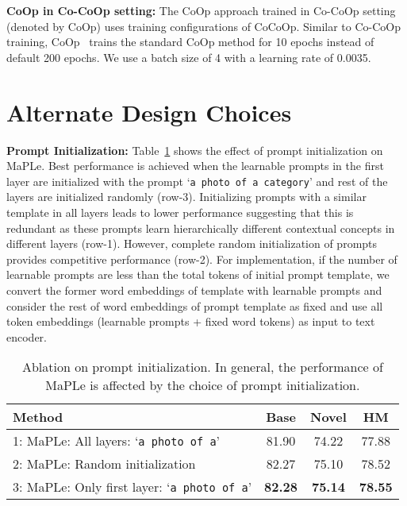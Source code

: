 \documentclass[10pt,twocolumn,letterpaper]{article}
\newcommand{\tablestyle}[2]{\setlength{\tabcolsep}{#1}\renewcommand{\arraystretch}{#2}\centering\footnotesize}
\newcommand{\txt}[1]{{\texttt{#1}}}
\begin{document}
\noindent \textbf{CoOp in Co-CoOp setting:} The CoOp approach trained in Co-CoOp setting (denoted by CoOp\dag) uses training configurations of CoCoOp. Similar to Co-CoOp training, CoOp\dag~ trains the standard CoOp method for 10 epochs instead of default 200 epochs. We use a batch size of 4 with a learning rate of 0.0035.

\section{Alternate Design Choices}
\label{appendix:alternate_design_choices}

\noindent \textbf{Prompt Initialization:} 
 Table~\ref{table:prompt_initialization} shows the effect of prompt initialization on MaPLe. Best performance is achieved when the learnable prompts in the first layer are initialized with the prompt `\txt{a photo of a category}' and rest of the layers are initialized randomly (row-3). Initializing prompts with a similar template in all layers leads to lower performance suggesting that 
this is redundant as these prompts learn hierarchically different contextual concepts in different layers (row-1). However, complete random initialization of prompts provides competitive performance (row-2). For implementation, if the number of learnable prompts  are less than the total tokens of initial prompt template, we convert the former  word embeddings of template with learnable prompts and consider the rest of word embeddings of prompt template as fixed and use all token embeddings (learnable prompts + fixed word tokens) as input to text encoder.

\begin{table}[h!]
\centering
    \tablestyle{6pt}{1.1}
\addtolength{\tabcolsep}{-4.5pt}
\begin{tabular}{l ccc}
\toprule
Method  & Base & Novel & HM\\
\midrule
1: MaPLe: All layers: `\txt{a photo of a}' & 81.90 & 74.22 &	77.88\\
2: MaPLe: Random initialization  & 82.27 &	75.10 &	78.52\\
3: MaPLe: Only first layer: `\txt{a photo of a}' & \textbf{82.28} &	\textbf{75.14} &	\textbf{78.55}\\
\bottomrule
\end{tabular}
\caption{
{Ablation on prompt initialization.} In general, the performance of MaPLe is affected by the choice of prompt initialization.
} 
\label{table:prompt_initialization}
\end{table}
\end{document}
